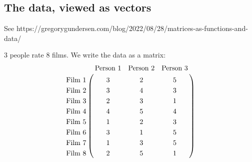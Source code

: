 
\newpage
\subsection*{The data, viewed as vectors}

See https://gregorygundersen.com/blog/2022/08/28/matrices-as-functions-and-data/

3 people rate 8 films. We write the data as a matrix:
\begin{align*}
\bordermatrix{
                &\text{Person 1} & \text{Person 2} &\text{Person 3} \cr
  \text{Film 1} &3               &  2              &  5             \cr
  \text{Film 2} &3               &  4              &  3             \cr
  \text{Film 3} &2               &  3              &  1             \cr
  \text{Film 4} &4               &  5              &  4             \cr
  \text{Film 5} &1               &  2              &  3             \cr
  \text{Film 6} &3               &  1              &  5             \cr
  \text{Film 7} &1               &  3              &  5             \cr
  \text{Film 8} &2               &  5              &  1             \cr
}
\end{align*}

